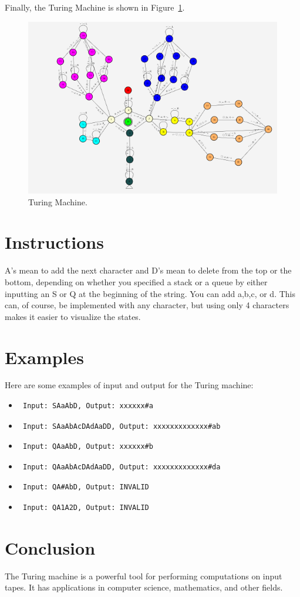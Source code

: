 \documentclass{article}
\begin{document}
Finally, the Turing Machine is shown in Figure\ \ref{fig:stackqueue}.
\begin{figure}
    \includegraphics[width=\linewidth]{stackqueue.png}
    \caption{Turing Machine.}\label{fig:stackqueue}
\end{figure}

\section{Instructions}
A's mean to add the next character and D's mean to delete from the top or the bottom, depending on whether you specified a stack or a queue
by either inputting an S or Q at the beginning of the string. 
You can add a,b,c, or d. This can, of course, be implemented with any character,
but using only 4 characters makes it easier to visualize the states.

\section{Examples}
Here are some examples of input and output for the Turing machine:
\begin{itemize}
    \item \begin{verbatim} Input: SAaAbD, Output: xxxxxx#a \end{verbatim}
    \item \begin{verbatim} Input: SAaAbAcDAdAaDD, Output: xxxxxxxxxxxxx#ab \end{verbatim}
    \item \begin{verbatim} Input: QAaAbD, Output: xxxxxx#b \end{verbatim}
    \item \begin{verbatim} Input: QAaAbAcDAdAaDD, Output: xxxxxxxxxxxxx#da \end{verbatim}
    \item \begin{verbatim} Input: QA#AbD, Output: INVALID \end{verbatim}
    \item \begin{verbatim} Input: QA1A2D, Output: INVALID \end{verbatim}
\end{itemize}

\section{Conclusion}
The Turing machine is a powerful tool for performing computations on input tapes. It has applications in computer science, mathematics, and other fields.
\end{document}
